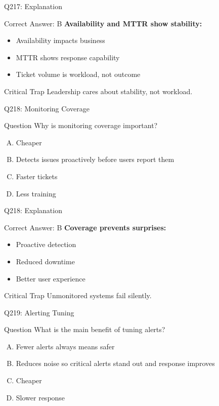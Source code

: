 \documentclass{beamer}
\begin{document}
	\begin{frame}{Q217: Explanation}
		\begin{block}{Correct Answer: B}
			\textbf{Availability and MTTR show stability:}
			\begin{itemize}
				\item Availability impacts business
				\item MTTR shows response capability
				\item Ticket volume is workload, not outcome
			\end{itemize}
		\end{block}
		\begin{alertblock}{Critical Trap}
			Leadership cares about stability, not workload.
		\end{alertblock}
	\end{frame}
	
	\begin{frame}{Q218: Monitoring Coverage}
		\begin{block}{Question}
			Why is monitoring coverage important?
		\end{block}
		\begin{enumerate}[(A)]
			\item Cheaper
			\item Detects issues proactively before users report them
			\item Faster tickets
			\item Less training
		\end{enumerate}
	\end{frame}
	
	\begin{frame}{Q218: Explanation}
		\begin{block}{Correct Answer: B}
			\textbf{Coverage prevents surprises:}
			\begin{itemize}
				\item Proactive detection
				\item Reduced downtime
				\item Better user experience
			\end{itemize}
		\end{block}
		\begin{alertblock}{Critical Trap}
			Unmonitored systems fail silently.
		\end{alertblock}
	\end{frame}
	
	\begin{frame}{Q219: Alerting Tuning}
		\begin{block}{Question}
			What is the main benefit of tuning alerts?
		\end{block}
		\begin{enumerate}[(A)]
			\item Fewer alerts always means safer
			\item Reduces noise so critical alerts stand out and response improves
			\item Cheaper
			\item Slower response
		\end{enumerate}
	\end{frame}
	
\end{document}
